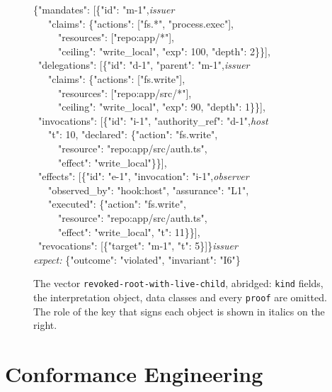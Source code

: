\documentclass[conference]{IEEEtran}
\newcommand{\code}[1]{\texttt{\small #1}}
\begin{document}
\begin{figure}[t]
\centering
\begin{minipage}{\columnwidth}\scriptsize\ttfamily
\{"mandates": [\{"id": "m-1",\hfill\textrm{\itshape issuer}\\
\ \ \ "claims": \{"actions": ["fs.*", "process.exec"],\\
\ \ \ \ \ "resources": ["repo:app/*"],\\
\ \ \ \ \ "ceiling": "write\_local", "exp": 100, "depth": 2\}\}],\\
\ "delegations": [\{"id": "d-1", "parent": "m-1",\hfill\textrm{\itshape issuer}\\
\ \ \ "claims": \{"actions": ["fs.write"],\\
\ \ \ \ \ "resources": ["repo:app/src/*"],\\
\ \ \ \ \ "ceiling": "write\_local", "exp": 90, "depth": 1\}\}],\\
\ "invocations": [\{"id": "i-1", "authority\_ref": "d-1",\hfill\textrm{\itshape host}\\
\ \ \ "t": 10, "declared": \{"action": "fs.write",\\
\ \ \ \ \ "resource": "repo:app/src/auth.ts",\\
\ \ \ \ \ "effect": "write\_local"\}\}],\\
\ "effects": [\{"id": "e-1", "invocation": "i-1",\hfill\textrm{\itshape observer}\\
\ \ \ "observed\_by": "hook:host", "assurance": "L1",\\
\ \ \ "executed": \{"action": "fs.write",\\
\ \ \ \ \ "resource": "repo:app/src/auth.ts",\\
\ \ \ \ \ "effect": "write\_local", "t": 11\}\}],\\
\ "revocations": [\{"target": "m-1", "t": 5\}]\}\hfill\textrm{\itshape issuer}\\[3pt]
\textrm{\itshape expect:} \{"outcome": "violated", "invariant": "I6"\}
\end{minipage}
\caption{The vector \code{revoked-root-with-live-child}, abridged: \code{kind} fields, the interpretation object, data classes and every \code{proof} are omitted. The role of the key that signs each object is shown in italics on the right.}\label{fig:packet}
\end{figure}

\section{Conformance Engineering}\label{sec:conf}
\end{document}
